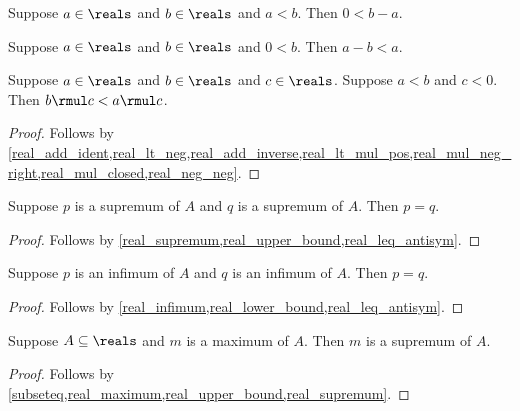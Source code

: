 \begin{lemma}\label{real_lt_imp_pos_diff}
    Suppose $a\in\reals$ and $b\in\reals$ and $a < b$.
    Then $0 < b - a$.
\end{lemma}

\begin{lemma}\label{real_sub_pos_lt}
    Suppose $a\in\reals$ and $b\in\reals$ and $0 < b$.
    Then $a - b < a$.
\end{lemma}

\begin{proposition}\label{real_lt_mul_neg}
    Suppose $a\in\reals$ and $b\in\reals$ and $c\in\reals$.
    Suppose $a < b$ and $c < 0$.
    Then $b \rmul c < a \rmul c$.
\end{proposition}
\begin{proof}
    Follows by \cref{real_add_ident,real_lt_neg,real_add_inverse,real_lt_mul_pos,real_mul_neg_right,real_mul_closed,real_neg_neg}.
\end{proof}

\begin{proposition}\label{real_supremum_unique}
    Suppose $p$ is a supremum of $A$ and $q$ is a supremum of $A$.
    Then $p = q$.
\end{proposition}
\begin{proof}
    Follows by \cref{real_supremum,real_upper_bound,real_leq_antisym}.
\end{proof}

\begin{proposition}\label{real_infimum_unique}
    Suppose $p$ is an infimum of $A$ and $q$ is an infimum of $A$.
    Then $p = q$.
\end{proposition}
\begin{proof}
    Follows by \cref{real_infimum,real_lower_bound,real_leq_antisym}.
\end{proof}

\begin{proposition}\label{real_maximum_is_supremum}
    Suppose $A\subseteq\reals$ and $m$ is a maximum of $A$.
    Then $m$ is a supremum of $A$.
\end{proposition}
\begin{proof}
    Follows by \cref{subseteq,real_maximum,real_upper_bound,real_supremum}.
\end{proof}

